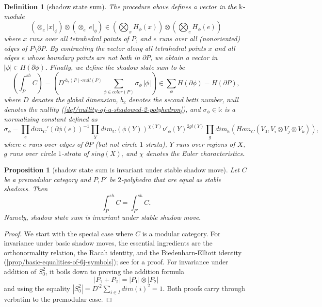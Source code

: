 \documentclass[12pt]{extarticle}
\numberwithin{equation}{section} %
\theoremstyle{mystyle}
\newtheorem{proposition}[equation]{Proposition}
\newtheorem{definition}[equation]{Definition}
\begin{document}
\begin{definition}[shadow state sum]
\noindent The procedure above defines a vector in the
$\mathbb{k}$-module
$$(\otimes_{x} |x|_{\phi}) \otimes (\otimes_{e} |e|_{\phi}) \in \left( \bigotimes_{x} H_{\phi}(x) \right) \otimes \left( \bigotimes_{e} H_{\phi}(e) \right)$$
where $x$ runs over all tetrahedral points of $P$, and $e$ runs
over all (nonoriented) edges of $P \setminus \partial P$. By
contracting the vector along all tetrahedral points $x$ and all
edges $e$ whose boundary points are not both in $\partial P$, we
obtain a vector in $|\phi| \in H(\partial \phi)$. Finally, we
define the shadow state sum to be
$$\left(\int^{sh}_{P} C \right) = \left( D^{\text{-} b_{2}(P) \text{-} null(P)} \sum_{\phi \in color(P)} \sigma_{\phi} \, |\phi| \right) \in \sum_{\phi} H(\partial \phi) = H(\partial P),$$
where $D$ denotes the global dimension, $b_{2}$ denotes the
second betti number, $null$ denotes the nullity
(\ref{def/nullity-of-a-shadowed-2-polyhedron}), and
$\sigma_{\phi} \in \mathbb{k}$ is a normalizing constant defined
as
$$\sigma_{\phi} = \prod_{e} dim_{C}'(\partial\phi(e))^{-1} \prod_{Y} dim_{C}(\phi(Y))^{\chi(Y)} \nu'_{\phi}(Y)^{2gl(Y)} \prod_{g} dim_{\mathbb{k}}(Hom_{C}(V_{0}, V_{i} \otimes V_{j} \otimes V_{k})),$$
where $e$ runs over edges of $\partial P$ (but not circle
$1$-strata), $Y$ runs over regions of $X$, $g$ runs over circle
$1$-strata of $sing(X)$, and $\chi$ denotes the Euler
characteristics.
\end{definition}

\begin{proposition}[shadow state sum is invariant under stable
  shadow
  move]\label{prop/shadow-state-sum-is-invariant-under-stable-shadow-move}
  Let $C$ be a premodular category and $P, P'$ be $2$-polyhedra
  that are equal as stable shadows. Then
  $$\int^{sh}_{P} C = \int^{sh}_{P'} C.$$
  Namely, shadow state sum is invariant under stable shadow move.
\end{proposition}
\begin{proof}
  We start with the special case where $C$ is a modular category.
  For invariance under basic shadow moves, the essential
  ingredients are the orthonormality relation, the Racah
  identity, and the Biedenharn-Elliott identity
  (\ref{prop/basic-equalities-of-6j-symbols}); see \cite[theorem
  X.2.1]{turaev-qiok-3-manifolds} for a proof. For invariance
  under addition of $S^{2}_{0}$, it boils down to proving the
  addition formula $$|P_{1} + P_{2}| = |P_{1}| \otimes |P_{2}|$$
  \cite[theorem X.2.2]{turaev-qiok-3-manifolds} and using the
  equality $|S^{2}_{0}| = D^{\text{-}2} \sum_{i \in I} dim(i)^{2} = 1$.
  Both proofs carry through verbatim to the premodular case.
\end{proof}
\end{document}
